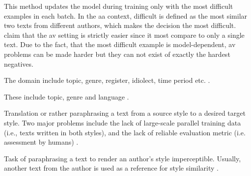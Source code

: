 \begin{definition}
    This method updates the model during training only with the most difficult examples in each batch.
    In the \ac{aa} context, difficult is defined as the most similar two texts from different authors, 
    which makes the decision the most difficult.
    \citet{tyo_state_2022} claim that the \ac{av} setting is strictly easier since 
    it most compare to only a single text.
    Due to the fact, that the most difficult example is model-dependent, \ac{av} problems can be made harder 
    but they can not exist of exactly the hardest negatives.
\end{definition}

\begin{definition}
    [Domain]
    The domain include topic, genre, register, idiolect, time period etc. \cite{bischoff_importance_2020}.
\end{definition}
  
\begin{definition}
    These include topic, genre and language \cite{bischoff_importance_2020}.
\end{definition}

\begin{definition}
    Translation or rather paraphrasing a text from a source style to a desired target style.
    Two major problems include the lack of large-scale parallel training data (i.e., texts written in both styles), 
    and the lack of reliable evaluation metric (i.e. assessment by humans) \cite{bischoff_importance_2020}.
\end{definition}

\begin{definition}
    Task of paraphrasing a text to render an author's style imperceptible.
    Usually, another text from the author is used as a reference for style similarity \cite{bischoff_importance_2020}.
\end{definition}

